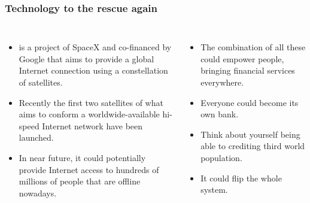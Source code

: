 \documentclass[notitlepage, usenames,dvipsnames]{beamer}
\newcommand{\st}{\structure}
\begin{document}
    \begin{frame}
        \frametitle{Technology to the rescue again}

        \begin{columns}

             {
                \begin{itemize}
                    \itemsep=1.5ex
                    \item \st{\textbf{Starlink}} is a project of SpaceX and co-financed by Google that aims to provide a global Internet connection using a constellation of satellites.
                    \item Recently the first two satellites of what aims to conform a worldwide-available hi-speed Internet network have been launched.
                    \item In near future, it could \alert{potentially provide} Internet access to hundreds of millions of people that are offline nowadays.
                \end{itemize}
            }

             {
                \begin{itemize}
                    \itemsep=1.5ex
                    \item The combination of all these could \alert{empower people}, bringing financial services everywhere.
                    \item Everyone could become its own bank.
                    \item Think about yourself being able to crediting third world population.
                    \item It could flip the whole system.
                \end{itemize}
            }






\end{columns}
\end{frame}
\end{document}
